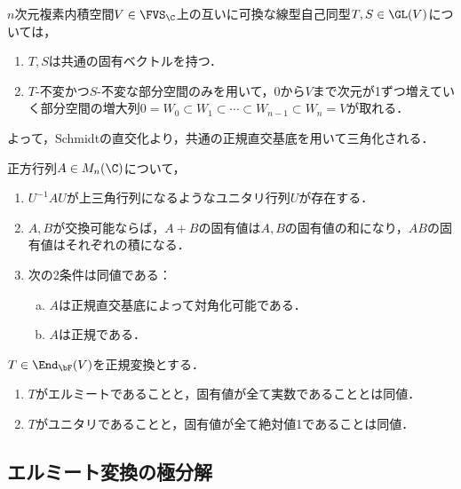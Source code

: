 \documentclass[uplatex, dvipdfmx]{jsreport}
\begin{document}
\begin{theorem}[可換な線形変換に対して空間上で起こっている消息]
    $n$次元複素内積空間$V\in\FVS_\C$上の互いに可換な線型自己同型$T,S\in\GL(V)$については，
    \begin{enumerate}
        \item $T,S$は共通の固有ベクトルを持つ．
        \item $T$-不変かつ$S$-不変な部分空間のみを用いて，$0$から$V$まで次元が1ずつ増えていく部分空間の増大列$0=W_0\subset W_1\subset\cdots\subset W_{n-1}\subset W_n=V$が取れる．
    \end{enumerate}
    よって，Schmidtの直交化より，共通の正規直交基底を用いて三角化される．
\end{theorem}

\begin{corollary}[正規性の対角化可能性による特徴付け]
    正方行列$A\in M_n(\C)$について，
    \begin{enumerate}
        \item $U^{-1}AU$が上三角行列になるようなユニタリ行列$U$が存在する．
        \item $A,B$が交換可能ならば，$A+B$の固有値は$A,B$の固有値の和になり，$AB$の固有値はそれぞれの積になる．
        \item 次の2条件は同値である：
        \begin{enumerate}[(a)]
            \item $A$は正規直交基底によって対角化可能である．
            \item $A$は正規である．
        \end{enumerate}
    \end{enumerate}
\end{corollary}

\begin{corollary}[スペクトル定理の系]
    $T\in\End_\bF(V)$を正規変換とする．
    \begin{enumerate}
        \item $T$がエルミートであることと，固有値が全て実数であることとは同値．
        \item $T$がユニタリであることと，固有値が全て絶対値1であることは同値．
    \end{enumerate}
\end{corollary}

\subsection{エルミート変換の極分解}
\end{document}
